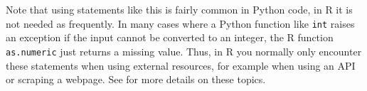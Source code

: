 Note that using  statements like this is fairly common in Python code,
in R it is not needed as frequently.
In many cases where a Python function like \verb|int| raises an exception
if the input cannot be converted to an integer, the R function \verb|as.numeric| just returns a missing value.
Thus, in R you normally only encounter these statements when using external resources,
for example when using an API or scraping a webpage. See  for more details on these topics. 

